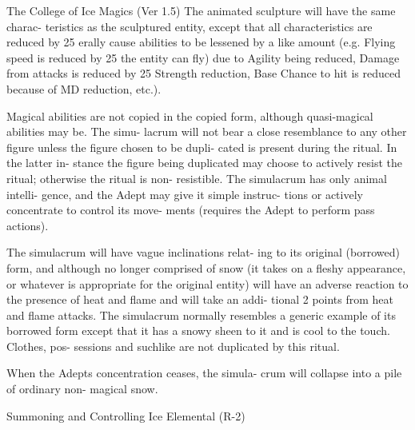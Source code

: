 \begin{Chapter}{The College of Ice Magics (Ver 1.5)}
The animated sculpture will have the same charac-
teristics  as  the  sculptured  entity,  except  that  all 
characteristics are  reduced  by  25%
erally  cause  abilities  to  be  lessened  by  a  like 
amount  (e.g.  Flying  speed  is  reduced  by  25%
the  entity  can  fly)  due  to  Agility  being  reduced, 
Damage  from  attacks  is  reduced  by  25%
Strength  reduction,  Base  Chance  to  hit  is  reduced 
because of MD reduction, etc.).  

Magical abilities are not copied in the copied form, 
although quasi-magical abilities may be. The simu-
lacrum  will  not  bear  a  close  resemblance  to  any 
other  figure  unless  the  figure  chosen  to  be  dupli-
cated  is  present  during  the  ritual.  In  the  latter  in-
stance  the  figure  being  duplicated  may  choose  to 
actively resist the ritual; otherwise the ritual is non-
resistible.  The  simulacrum has  only  animal  intelli-
gence,  and  the  Adept  may  give  it  simple  instruc-
tions  or  actively  concentrate  to  control  its  move-
ments (requires the Adept to perform pass actions).  

The simulacrum will have vague inclinations relat-
ing  to  its  original  (borrowed)  form,  and  although 
no  longer  comprised  of  snow  (it  takes  on  a  fleshy 
appearance,  or  whatever  is  appropriate  for  the 
original entity) will have an adverse reaction to the 
presence  of  heat  and  flame  and  will  take  an  addi-
tional  2  points  from  heat  and  flame  attacks.  The 
simulacrum normally resembles a generic example 
of  its  borrowed  form  except  that  it  has  a  snowy 
sheen  to  it  and  is  cool  to  the  touch.  Clothes,  pos-
sessions  and  suchlike  are  not  duplicated  by  this 
ritual.  

When the Adepts concentration ceases, the simula-
crum  will  collapse  into  a  pile  of  ordinary  non-
magical snow. 

Summoning and Controlling Ice Elemental 
(R-2) 


\end{Chapter}
